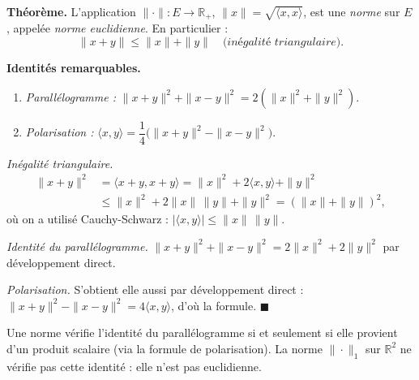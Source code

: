 \decsep{}


\begin{tcolorbox}[thmbox]
  \textbf{Théorème.}\enspace%
  L'application $\|\cdot\| : E \to \mathbb{R}_+$,\enspace%
  $\|x\| = \sqrt{\langle x,x\rangle}$, est une \emph{norme}
  sur $E$, appelée \emph{norme euclidienne}. En particulier :
  \[
    \|x + y\| \leq \|x\| + \|y\| \quad\textit{(inégalité triangulaire)}.
  \]

  \medskip
  \textbf{Identités remarquables.}
  \begin{enumerate}
    \item \textit{Parallélogramme :}
    $\|x+y\|^2 + \|x-y\|^2 = 2(\|x\|^2 + \|y\|^2)$.
    \item \textit{Polarisation :}
    $\langle x,y\rangle = \dfrac{1}{4}\bigl(\|x+y\|^2 - \|x-y\|^2\bigr)$.
  \end{enumerate}
\end{tcolorbox}

\begin{mdframed}[style=proofbar]
  \textit{Inégalité triangulaire.}
  \begin{align*}
    \|x+y\|^2 &= \langle x+y,x+y\rangle = \|x\|^2 + 2\langle x,y\rangle + \|y\|^2 \\
              &\leq \|x\|^2 + 2\|x\|\,\|y\| + \|y\|^2 = {(\|x\|+\|y\|)}^2,
  \end{align*}
  où on a utilisé Cauchy-Schwarz : $|\langle x,y\rangle| \leq \|x\|\,\|y\|$.

  \textit{Identité du parallélogramme.}
  $\|x+y\|^2 + \|x-y\|^2 = 2\|x\|^2 + 2\|y\|^2$ par développement direct.

  \textit{Polarisation.} S'obtient elle aussi par développement direct :
  $\|x+y\|^2 - \|x-y\|^2 = 4\langle x,y\rangle$, d'où la formule.
  $\blacksquare$
\end{mdframed}

Une norme vérifie l'identité du parallélogramme si et seulement si elle provient
d'un produit scalaire (via la formule de polarisation). La norme $\|\cdot\|_1$
sur $\mathbb{R}^2$ ne vérifie pas cette identité : elle n'est pas euclidienne.

\decsep{}

